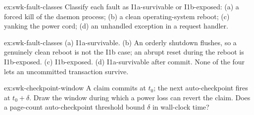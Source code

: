 \documentclass[11pt,a4paper]{article}
\theoremstyle{definition}
\theoremstyle{remark}
\begin{document}

\begin{pdexercise}[kind=Check,rating=1]{ex:swk-fault-classes}
Classify each fault as I1a-survivable or I1b-exposed: (a) a forced kill of the daemon process; (b) a clean operating-system reboot; (c) yanking the power cord; (d) an unhandled exception in a request handler.
\end{pdexercise}
\begin{pdsolution}{ex:swk-fault-classes}
(a) I1a-survivable. (b) An orderly shutdown flushes, so a genuinely clean reboot is not the I1b case; an abrupt reset during the reboot is I1b-exposed. (c) I1b-exposed. (d) I1a-survivable after commit. None of the four lets an uncommitted transaction survive.
\end{pdsolution}
\begin{pdexercise}[kind=Trace,rating=2]{ex:swk-checkpoint-window}
A claim commits at $t_0$; the next auto-checkpoint fires at $t_0+\delta$. Draw the window during which a power loss can revert the claim. Does a page-count auto-checkpoint threshold bound $\delta$ in wall-clock time?
\end{pdexercise}
\end{document}
